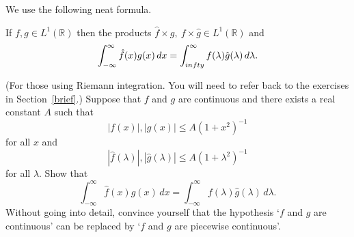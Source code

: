 We use the following neat formula.
\begin{lemma}\label{neat} If $f,g\in L^{1}({\mathbb R})$
then the products
$\hat{f}\times g,\ f\times\hat{g}\in L^{1}({\mathbb R})$
and
\[\int_{-\infty}^{\infty}\hat{f}(x)g(x)\,dx
=\int_{\-infty}^{\infty}f(\lambda)\hat{g}(\lambda)
\,d\lambda.\]
\end{lemma}

\begin{exercise} (For those using Riemann integration.
You will need to refer back to the exercises in
Section~\ref{brief}.) Suppose that $f$ and $g$ are continuous
and
there exists a real constant $A$ such that
\[|f(x)|,|g(x)|\leq A(1+x^{2})^{-1}\]
for all $x$ and
\[|\hat{f}(\lambda)|,|\hat{g}(\lambda)|\leq A(1+\lambda^{2})^{-1}\]
for all $\lambda$. Show that
\[\int_{-\infty}^{\infty}\hat{f}(x)g(x)\,dx
=\int_{-\infty}^{\infty}f(\lambda)\hat{g}(\lambda)\,d\lambda.\]
Without going into detail, convince yourself that
the hypothesis `$f$ and $g$ are continuous'
can be replaced by `$f$ and $g$ are piecewise continuous'.
\end{exercise}

